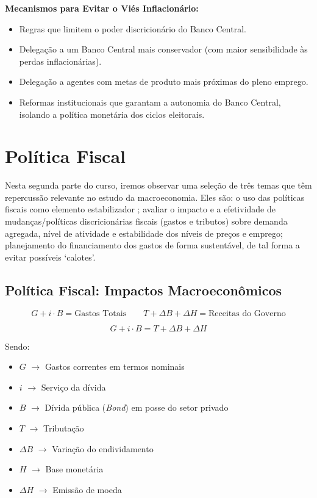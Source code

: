 \documentclass[a4paper,12pt]{article}[abntex2]
\begin{document}
\textbf{Mecanismos para Evitar o Viés Inflacionário:}
\begin{itemize}
    \item Regras que limitem o poder discricionário do Banco Central.
    \item Delegação a um Banco Central mais conservador (com maior sensibilidade às perdas inflacionárias).
    \item Delegação a agentes com metas de produto mais próximas do pleno emprego.
    \item Reformas institucionais que garantam a autonomia do Banco Central, isolando a política monetária dos ciclos eleitorais.
\end{itemize}

\newpage 
\section{\textbf{Política Fiscal}}
Nesta segunda parte do curso, iremos observar uma seleção de três temas que têm repercussão relevante no estudo da macroeconomia. Eles são: o uso das políticas fiscais como elemento estabilizador ; avaliar o impacto e a efetividade de mudanças/políticas discricionárias  fiscais (gastos e tributos) sobre demanda agregada, nível de atividade e estabilidade dos níveis de preços e emprego; planejamento do financiamento dos gastos de forma sustentável, de tal forma a evitar possíveis ‘calotes’. 

\subsection{\textbf{Política Fiscal: Impactos Macroeconômicos}}

\[
G + i \cdot B = \text{Gastos Totais}
\quad \quad
T + \Delta B + \Delta H = \text{Receitas do Governo}
\]

\[
G + i \cdot B = T + \Delta B + \Delta H
\]

Sendo:
\begin{itemize}
    \item $G$ \(\rightarrow\) Gastos correntes em termos nominais
    \item $i$ \(\rightarrow\) Serviço da dívida
    \item $B$ \(\rightarrow\) Dívida pública (\textit{Bond}) em posse do setor privado
    \item $T$ \(\rightarrow\) Tributação
    \item $\Delta B$ \(\rightarrow\) Variação do endividamento
    \item $H$ \(\rightarrow\) Base monetária
    \item $\Delta H$ \(\rightarrow\) Emissão de moeda
\end{itemize}
\end{document}
